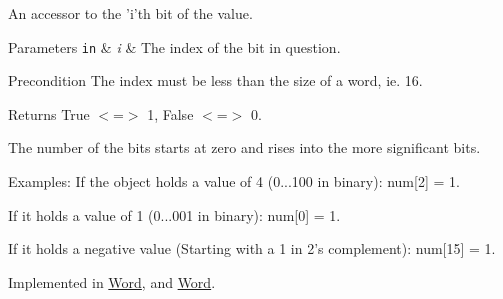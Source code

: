 An accessor to the 'i'th bit of the value. 


\begin{DoxyParams}[1]{Parameters}
\mbox{\tt in}  & {\em i} & The index of the bit in question. \\
\hline
\end{DoxyParams}
\begin{DoxyPrecond}{Precondition}
The index must be less than the size of a word, ie. 16. 
\end{DoxyPrecond}
\begin{DoxyReturn}{Returns}
True $<$=$>$ 1, False $<$=$>$ 0.
\end{DoxyReturn}
The number of the bits starts at zero and rises into the more significant bits. \begin{DoxyParagraph}{Examples:}
If the object holds a value of 4 (0...100 in binary): num\mbox{[}2\mbox{]} = 1.\par
 If it holds a value of 1 (0...001 in binary): num\mbox{[}0\mbox{]} = 1.\par
 If it holds a negative value (Starting with a 1 in 2's complement): num\mbox{[}15\mbox{]} = 1. 
\end{DoxyParagraph}


Implemented in \hyperlink{classWord_a0b08a81ced05b38d3d719ef70ecb3215}{Word}, and \hyperlink{classWord_a0b08a81ced05b38d3d719ef70ecb3215}{Word}.

